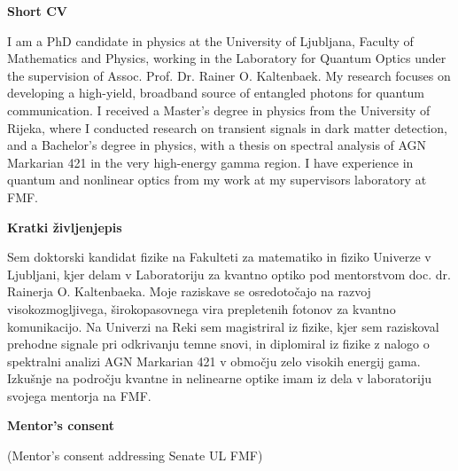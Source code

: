 \documentclass{article}
\theoremstyle{mytheoremstyle}
\theoremstyle{mytheoremstyle}
\theoremstyle{myproblemstyle}
\begin{document}
\begin{center}
    \textbf{Short CV}
\end{center}
I am a PhD candidate in physics at the University of Ljubljana, Faculty of Mathematics and Physics,
working in the Laboratory for Quantum Optics under the supervision of Assoc. Prof. Dr. Rainer O. Kaltenbaek.
My research focuses on developing a high-yield, broadband source of entangled photons for quantum communication.
I received a Master’s degree in physics from the University of Rijeka,
where I conducted research on transient signals in dark matter detection,
and a Bachelor’s degree in physics, with a thesis on spectral analysis of AGN Markarian 421 in the very high-energy gamma region.
I have experience in quantum and nonlinear optics from my work at my supervisors laboratory at FMF.

\vspace{1cm}

\begin{center}
    \textbf{Kratki življenjepis}
\end{center}
Sem doktorski kandidat fizike na Fakulteti za matematiko in fiziko Univerze v Ljubljani,
kjer delam v Laboratoriju za kvantno optiko pod mentorstvom doc. dr. Rainerja O. Kaltenbaeka.
Moje raziskave se osredotočajo na razvoj visokozmogljivega, širokopasovnega vira prepletenih fotonov za kvantno komunikacijo.
Na Univerzi na Reki sem magistriral iz fizike, kjer sem raziskoval prehodne signale pri odkrivanju temne snovi,
in diplomiral iz fizike z nalogo o spektralni analizi AGN Markarian 421 v območju zelo visokih energij gama.
Izkušnje na področju kvantne in nelinearne optike imam iz dela v laboratoriju svojega mentorja na FMF.



\clearpage
\pagestyle{plain}

\vspace{1cm}

\begin{center}
    \textbf{Mentor's consent}
\end{center}

\vspace{1cm}

\noindent (Mentor's consent addressing Senate UL FMF)

\end{document}
